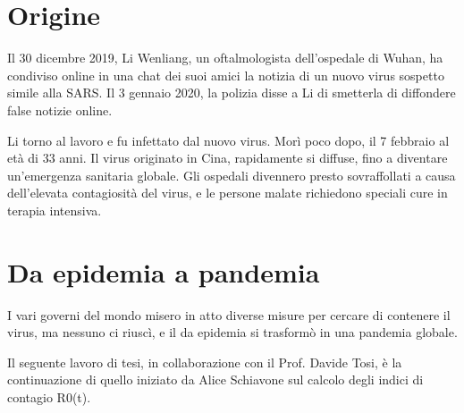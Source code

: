 \section{Origine}
Il 30 dicembre 2019, Li Wenliang, un oftalmologista dell’ospedale di Wuhan, ha condiviso online in una chat dei suoi amici la notizia di un nuovo virus sospetto simile alla SARS.
Il 3 gennaio 2020, la polizia disse a Li di smetterla di diffondere false notizie online.

Li torno al lavoro e fu infettato dal nuovo virus.
Morì poco dopo, il 7 febbraio al età di 33 anni.
Il virus originato in Cina, rapidamente si diffuse, fino a diventare un'emergenza sanitaria globale. Gli ospedali divennero presto sovraffollati a causa dell’elevata contagiosità del virus, e le persone malate richiedono speciali cure in terapia intensiva.

\section{Da epidemia a pandemia}
I vari governi del mondo misero in atto diverse misure per cercare di contenere il virus, ma nessuno ci riuscì, e il da epidemia si trasformò in una pandemia globale.




Il seguente lavoro di tesi, in collaborazione con il Prof. Davide Tosi,  è la continuazione di quello iniziato da Alice Schiavone sul calcolo degli indici di contagio R0(t).
